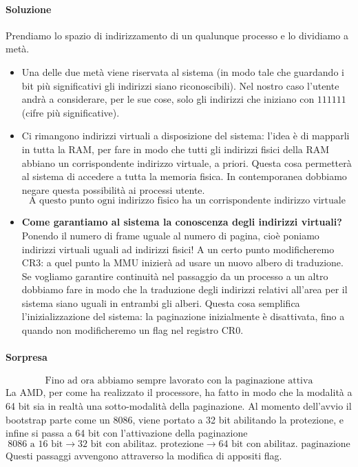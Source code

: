 \documentclass[11pt]{report}
\theoremstyle{definition}
\begin{document}
\paragraph{Soluzione} Prendiamo lo spazio di indirizzamento di un qualunque processo e lo dividiamo a metà. 
\begin{itemize}
	\item Una delle due metà viene riservata al sistema (in modo tale che guardando i bit più significativi gli indirizzi siano riconoscibili). Nel nostro caso l'utente andrà a considerare, per le sue cose, solo gli indirizzi che iniziano con $111111$ (cifre più significative).
	\item Ci rimangono indirizzi virtuali a disposizione del sistema: l'idea è di mapparli in tutta la RAM, per fare in modo che tutti gli indirizzi fisici della RAM abbiano un corrispondente indirizzo virtuale, a priori. Questa cosa permetterà al sistema di accedere a tutta la memoria fisica. In contemporanea dobbiamo negare questa possibilità ai processi utente.
	\[\boxed{\text{A questo punto ogni indirizzo fisico ha un corrispondente indirizzo virtuale}}\]
	\item \textbf{Come garantiamo al sistema la conoscenza degli indirizzi virtuali?} Ponendo il numero di frame uguale al numero di pagina, cioè poniamo indirizzi virtuali uguali ad indirizzi fisici! A un certo punto modificheremo CR3: a quel punto la MMU inizierà ad usare un nuovo albero di traduzione. Se vogliamo garantire continuità nel passaggio da un processo a un altro dobbiamo fare in modo che la traduzione degli indirizzi relativi all'area per il sistema siano uguali in entrambi gli alberi. Questa cosa semplifica l'inizializzazione del sistema: la paginazione inizialmente è disattivata, fino a quando non modificheremo un flag nel registro CR0. 
\end{itemize} 

\paragraph{Sorpresa} 
\[\boxed{\text{Fino ad ora abbiamo sempre lavorato con la paginazione attiva}}\]
\noindent La AMD, per come ha realizzato il processore, ha fatto in modo che la modalità  a 64 bit sia in realtà una sotto-modalità della paginazione. Al momento dell'avvio il bootstrap parte come un 8086, viene portato a 32 bit abilitando la protezione, e infine si passa a 64 bit con l'attivazione della paginazione
\[\text{8086 a 16 bit} \longrightarrow \text{32 bit con abilitaz. protezione} \longrightarrow \text{64 bit con abilitaz. paginazione}\]
Questi passaggi avvengono attraverso la modifica di appositi flag.
\end{document}
